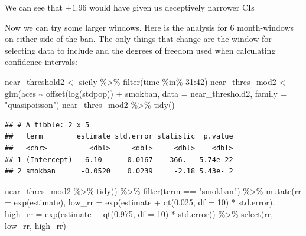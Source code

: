\documentclass[
]{book}
\newenvironment{Shaded}{\begin{snugshade}}{\end{snugshade}}
\newcommand{\AttributeTok}[1]{\textcolor[rgb]{0.77,0.63,0.00}{#1}}
\newcommand{\DecValTok}[1]{\textcolor[rgb]{0.00,0.00,0.81}{#1}}
\newcommand{\FloatTok}[1]{\textcolor[rgb]{0.00,0.00,0.81}{#1}}
\newcommand{\FunctionTok}[1]{\textcolor[rgb]{0.00,0.00,0.00}{#1}}
\newcommand{\NormalTok}[1]{#1}
\newcommand{\OtherTok}[1]{\textcolor[rgb]{0.56,0.35,0.01}{#1}}
\newcommand{\SpecialCharTok}[1]{\textcolor[rgb]{0.00,0.00,0.00}{#1}}
\newcommand{\StringTok}[1]{\textcolor[rgb]{0.31,0.60,0.02}{#1}}
\begin{document}
We can see that \(\pm 1.96\) would have given us deceptively narrower CIs

Now we can try some larger windows. Here is the analysis for 6 month-windows
on either side of the ban. The only things that change are the window for selecting data to include and the degrees of freedom used when calculating confidence intervals:

\begin{Shaded}
\begin{Highlighting}[]
\NormalTok{near\_threshold2 }\OtherTok{\textless{}{-}}\NormalTok{ sicily }\SpecialCharTok{\%\textgreater{}\%} 
  \FunctionTok{filter}\NormalTok{(time }\SpecialCharTok{\%in\%} \DecValTok{31}\SpecialCharTok{:}\DecValTok{42}\NormalTok{)}
\NormalTok{near\_thres\_mod2 }\OtherTok{\textless{}{-}} \FunctionTok{glm}\NormalTok{(aces }\SpecialCharTok{\textasciitilde{}} \FunctionTok{offset}\NormalTok{(}\FunctionTok{log}\NormalTok{(stdpop)) }\SpecialCharTok{+}\NormalTok{ smokban, }
                      \AttributeTok{data =}\NormalTok{ near\_threshold2, }
                      \AttributeTok{family =} \StringTok{"quasipoisson"}\NormalTok{)}
\NormalTok{near\_thres\_mod2 }\SpecialCharTok{\%\textgreater{}\%} 
  \FunctionTok{tidy}\NormalTok{()}
\end{Highlighting}
\end{Shaded}

\begin{verbatim}
## # A tibble: 2 x 5
##   term        estimate std.error statistic  p.value
##   <chr>          <dbl>     <dbl>     <dbl>    <dbl>
## 1 (Intercept)  -6.10      0.0167   -366.   5.74e-22
## 2 smokban      -0.0520    0.0239     -2.18 5.43e- 2
\end{verbatim}

\begin{Shaded}
\begin{Highlighting}[]
\NormalTok{near\_thres\_mod2 }\SpecialCharTok{\%\textgreater{}\%} 
  \FunctionTok{tidy}\NormalTok{() }\SpecialCharTok{\%\textgreater{}\%} 
  \FunctionTok{filter}\NormalTok{(term }\SpecialCharTok{==} \StringTok{"smokban"}\NormalTok{) }\SpecialCharTok{\%\textgreater{}\%} 
  \FunctionTok{mutate}\NormalTok{(}\AttributeTok{rr =} \FunctionTok{exp}\NormalTok{(estimate), }
         \AttributeTok{low\_rr =} \FunctionTok{exp}\NormalTok{(estimate }\SpecialCharTok{+} \FunctionTok{qt}\NormalTok{(}\FloatTok{0.025}\NormalTok{, }\AttributeTok{df =} \DecValTok{10}\NormalTok{) }\SpecialCharTok{*}\NormalTok{ std.error), }
         \AttributeTok{high\_rr =} \FunctionTok{exp}\NormalTok{(estimate }\SpecialCharTok{+} \FunctionTok{qt}\NormalTok{(}\FloatTok{0.975}\NormalTok{, }\AttributeTok{df =} \DecValTok{10}\NormalTok{) }\SpecialCharTok{*}\NormalTok{ std.error)) }\SpecialCharTok{\%\textgreater{}\%} 
  \FunctionTok{select}\NormalTok{(rr, low\_rr, high\_rr)}
\end{Highlighting}
\end{Shaded}
\end{document}
